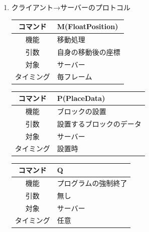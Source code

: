 \documentclass{jarticle}
\begin{document}
\begin{enumerate}
    \item クライアント→サーバーのプロトコル
    \begin{table}[h]
        \label{table:command2-1}
        \begin{center}
            \begin{tabular}{|c||p{30em}|}\hline
                コマンド&M(FloatPosition)\\\hline
                機能&移動処理\\
                引数&自身の移動後の座標\\
                対象&サーバー\\
                タイミング&毎フレーム\\\hline
            \end{tabular}
        \end{center}
    \end{table}
    \begin{table}[h]
        \label{table:command2-2}
        \begin{center}
            \begin{tabular}{|c||p{30em}|}\hline
                コマンド&P(PlaceData)\\\hline
                機能&ブロックの設置\\
                引数&設置するブロックのデータ\\
                対象&サーバー\\
                タイミング&設置時\\\hline
            \end{tabular}
        \end{center}
    \end{table}
    \begin{table}[h]
        \label{table:command2-3}
        \begin{center}
            \begin{tabular}{|c||p{30em}|}\hline
                コマンド&Q\\\hline
                機能&プログラムの強制終了\\
                引数&無し\\
                対象&サーバー\\
                タイミング&任意\\\hline
            \end{tabular}
        \end{center}
    \end{table}
\end{enumerate}
\end{document}
